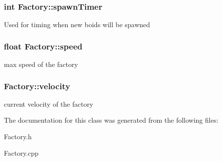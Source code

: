 \subsubsection[{\texorpdfstring{spawn\+Timer}{spawnTimer}}]{\setlength{\rightskip}{0pt plus 5cm}int Factory\+::spawn\+Timer\hspace{0.3cm}{\ttfamily [private]}}\hypertarget{class_factory_a98898fd82bbede3f1d012b3f27dc7582}{}\label{class_factory_a98898fd82bbede3f1d012b3f27dc7582}
Used for timing when new boids will be spawned 
\subsubsection[{\texorpdfstring{speed}{speed}}]{\setlength{\rightskip}{0pt plus 5cm}float Factory\+::speed\hspace{0.3cm}{\ttfamily [private]}}\hypertarget{class_factory_a9c83ade0995267b665b01332e5ee094a}{}\label{class_factory_a9c83ade0995267b665b01332e5ee094a}
max speed of the factory 
\subsubsection[{\texorpdfstring{velocity}{velocity}}]{ Factory\+::velocity\hspace{0.3cm}{\ttfamily [private]}}\hypertarget{class_factory_a221e6d7edc4f62594b03f1140a8eeafb}{}\label{class_factory_a221e6d7edc4f62594b03f1140a8eeafb}
current velocity of the factory 

The documentation for this class was generated from the following files\+:\begin{DoxyCompactItemize}
\item 
Factory.\+h\item 
Factory.\+cpp\end{DoxyCompactItemize}
